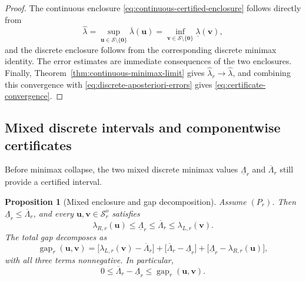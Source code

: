 \documentclass[preprint,10pt]{elsarticle}
\theoremstyle{plain}
\newtheorem{proposition}{Proposition}
\theoremstyle{definition}
\theoremstyle{remark}
\begin{document}
\begin{proof}
	The continuous enclosure \eqref{eq:continuous-certified-enclosure} follows
	directly from
	\[
	\hat\lambda
	=
	\sup_{\mathbf{u}\in\mathcal S\setminus\{\mathbf0\}}
	\overline\lambda(\mathbf{u})
	=
	\inf_{\mathbf{v}\in\mathcal S\setminus\{\mathbf0\}}
	\underline\lambda(\mathbf{v}),
	\]
	and the discrete enclosure follows from the corresponding discrete minimax
	identity. The error estimates are immediate consequences of the two
	enclosures. Finally, Theorem~\ref{thm:continuous-minimax-limit} gives
	\(\hat\lambda_r\to\hat\lambda\), and combining this convergence with
	\eqref{eq:discrete-aposteriori-errors} gives
	\eqref{eq:certificate-convergence}.
\end{proof}

\subsection{Mixed discrete intervals and componentwise certificates}
\label{subsec:mixed-minimax-enclosures}

Before minimax collapse, the two mixed discrete minimax values
\(\underline\Lambda_r\) and \(\overline\Lambda_r\) still provide a certified
interval.

\begin{proposition}[Mixed enclosure and gap decomposition]
	\label{prop:mixed-minimax-enclosure}
	Assume $(P_r)$. Then $\underline\Lambda_r\le\overline\Lambda_r$, and every
	$\mathbf{u},\mathbf{v}\in\mathcal{S}_r^o$ satisfies
	\begin{equation}\label{eq:mixed-minimax-enclosure}
		\lambda_{R,r}(\mathbf{u})
		\le \underline\Lambda_r \le \overline\Lambda_r
		\le \lambda_{L,r}(\mathbf{v}).
	\end{equation}
	The total gap decomposes as
	\begin{equation}\label{eq:mixed-gap-decomposition}
		\operatorname{gap}_r(\mathbf{u},\mathbf{v})
		= \bigl[\lambda_{L,r}(\mathbf{v})-\overline\Lambda_r\bigr]
		+ \bigl[\overline\Lambda_r-\underline\Lambda_r\bigr]
		+ \bigl[\underline\Lambda_r-\lambda_{R,r}(\mathbf{u})\bigr],
	\end{equation}
	with all three terms nonnegative. In particular,
	\begin{equation}\label{eq:mixed-gap-control}
		0 \le \overline\Lambda_r-\underline\Lambda_r
		\le \operatorname{gap}_r(\mathbf{u},\mathbf{v}).
	\end{equation}
\end{proposition}
\end{document}
